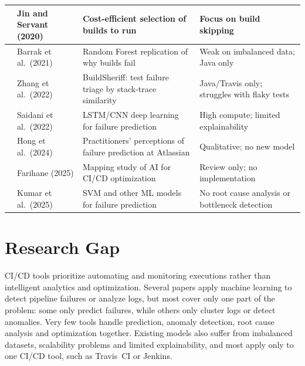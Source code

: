 \begin{longtable}{|>{\centering\arraybackslash}p{0.7cm}|p{2.9cm}|p{5.6cm}|p{5.0cm}|}
\cite{jin2020cost} & Jin and Servant (2020) & Cost-efficient selection of builds to run & Focus on build skipping\\ \hline
\cite{barrak2021why} & Barrak et al.\ (2021) & Random Forest replication of why builds fail & Weak on imbalanced data; Java only\\ \hline
\cite{zhang2022buildsheriff} & Zhang et al.\ (2022) & BuildSheriff: test failure triage by stack-trace similarity & Java/Travis only; struggles with flaky tests\\ \hline
\cite{saidani2022improving} & Saidani et al.\ (2022) & LSTM/CNN deep learning for failure prediction & High compute; limited explainability\\ \hline
\cite{hong2024practitioners} & Hong et al.\ (2024) & Practitioners' perceptions of failure prediction at Atlassian & Qualitative; no new model\\ \hline
\cite{farihane2025ci} & Farihane (2025) & Mapping study of AI for CI/CD optimization & Review only; no implementation\\ \hline
\cite{kumar2025optimizing} & Kumar et al.\ (2025) & SVM and other ML models for failure prediction & No root cause analysis or bottleneck detection\\ \hline
\end{longtable}

\section{Research Gap}
\label{sec:gap}
CI/CD tools prioritize automating and monitoring executions rather than intelligent analytics and optimization. Several papers apply machine learning to detect pipeline failures or analyze logs, but most cover only one part of the problem: some only predict failures, while others only cluster logs or detect anomalies. Very few tools handle prediction, anomaly detection, root cause analysis and optimization together. Existing models also suffer from imbalanced datasets, scalability problems and limited explainability, and most apply only to one CI/CD tool, such as Travis~CI or Jenkins.

